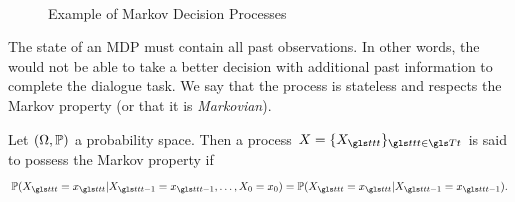 \begin{figure}
    \begin{center}
        \\
        \caption{Example of Markov Decision Processes}
        \label{fig:renonculacees}
    \end{center}
\end{figure}
%
The state of an \gls{MDP} must contain all past observations. In other words, the  would not be able to take a better decision with additional past information to complete the dialogue task. We say that the process is stateless and respects the Markov property (or that it is \textit{Markovian}).
\begin{definition}
    Let $(\Omega,\mathbb{P})$  a probability space. Then a  process $X=\{X_{\indextransition}\}_{\indextransition\in\T}$ is said to possess the Markov property if
    \begin{equation}
        \mathbb{P}(X_{\indextransition}=x_{\indextransition}|X_{\indextransition-1} = x_{\indextransition-1},\dots,X_0=x_0)=\mathbb{P}(X_{\indextransition}=x_{\indextransition}| X_{\indextransition-1}=x_{\indextransition-1}).
    \end{equation}
\end{definition}
